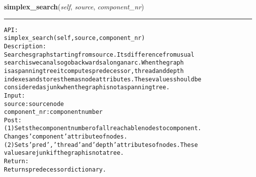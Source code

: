     \label{coinor:gimpy:graph:Graph:simplex_search}

    \vspace{0.5ex}

\hspace{.8\funcindent}\begin{boxedminipage}{\funcwidth}

    \raggedright \textbf{simplex\_search}(\textit{self}, \textit{source}, \textit{component\_nr})

    \vspace{-1.5ex}

    \rule{\textwidth}{0.5\fboxrule}
\setlength{\parskip}{2ex}
\begin{alltt}

API:
    simplex\_search(self, source, component\_nr)
Description:
    Searches graph starting from source. Its difference from usual
    search is we can also go backwards along an arc. When the graph
    is a spanning tree it computes predecessor, thread and depth
    indexes and stores them as node attributes. These values should be
    considered as junk when the graph is not a spanning tree.
Input:
    source: source node
    component\_nr: component number
Post:
    (1) Sets the component number of all reachable nodes to component.
    Changes 'component' attribute of nodes.
    (2) Sets 'pred', 'thread' and 'depth' attributes of nodes. These
    values are junk if the graph is not a tree.
Return:
    Returns predecessor dictionary.
\end{alltt}

\setlength{\parskip}{1ex}
    \end{boxedminipage}

    \label{coinor:gimpy:graph:Graph:simplex_select_entering_arc}

    \vspace{0.5ex}

